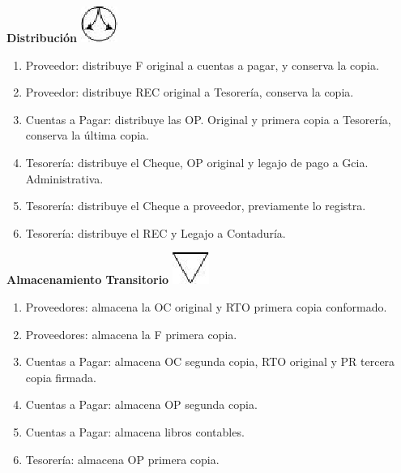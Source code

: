 \begin{center}
  \textbf{Distribución}
  \includegraphics{./Images/Simbolos/simbolo-Distribucion.png}
\end{center}
\begin{enumerate}
  \item Proveedor: distribuye F original a cuentas a pagar, y conserva la copia.
  \item Proveedor: distribuye REC original a Tesorería, conserva la copia.
  \item Cuentas a Pagar: distribuye las OP. Original y primera copia a Tesorería, conserva la \'ultima copia.
  \item Tesorería: distribuye el Cheque, OP original y legajo de pago a Gcia. Administrativa.
  \item Tesorería: distribuye el Cheque a proveedor, previamente lo registra.
  \item Tesorería: distribuye el REC y Legajo a Contaduría.
\end{enumerate}

\begin{center}
  \textbf{Almacenamiento Transitorio}
  \includegraphics{./Images/Simbolos/simbolo-Almacenamiento-Transitorio.png}
\end{center}
\begin{enumerate}
  \item Proveedores: almacena la OC original y RTO primera copia conformado.
  \item Proveedores: almacena la F primera copia.
  \item Cuentas a Pagar: almacena OC segunda copia, RTO original y PR tercera copia firmada.
  \item Cuentas a Pagar: almacena OP segunda copia.
  \item Cuentas a Pagar: almacena libros contables.
  \item Tesorería: almacena OP primera copia.
\end{enumerate}

